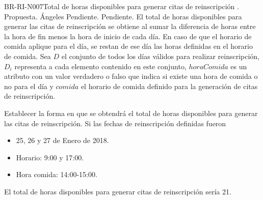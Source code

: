 \begin{BusinessRule}{BR-RI-N007}{Total de horas disponibles para generar citas de reinscripción}
	{\bcDerivation}    %
	{\btTimer}     %
	{\blControlling}    %
	.
	\BRItem[Estado] Propuesta.
	 Ángeles
	 Pendiente.
	 Pendiente.
	\BRItem[Descripción] El total de horas disponibles para generar las citas de reinscripción se obtiene al sumar la diferencia de horas entre la hora de fin menos la hora de inicio de cada día. En caso de que el horario de comida aplique para el día, se restan de ese día las horas definidas en el horario de comida.
	\BRItem[Sentencia] Sea $D$ el conjunto de todos los días válidos para realizar reinscripción, $D_i$ representa a cada elemento contenido en este conjunto, $horaComida$ es un atributo con un valor verdadero o falso que indica si existe una hora de comida o no para el día y $comida$ el horario de comida definido para la generación de citas de reinscripción.
	
	
	
	
%	
	

		
	\BRItem[Motivación] Establecer la forma en que se obtendrá el total de horas disponibles para generar las citas de reinscripción.
	\BRItem[Ejemplo]  Si las fechas de reinscripción definidas fueron
	\begin{itemize}
		\item 25, 26 y 27 de Enero de 2018.
		\item Horario: 9:00 y 17:00.
		\item Hora comida: 14:00-15:00.
	\end{itemize}
	
	El total de horas disponibles para generar citas de reinscripción sería 21.
	
\end{BusinessRule}

